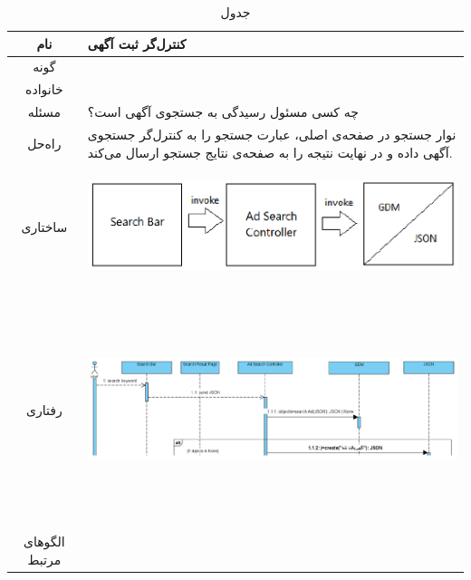 \begin{table}[H]
	\begin{adjustbox}{width=\textwidth}
		\begin{tabular}{|c|p{\textwidth}|}
			\hline
			نام &
			کنترل‌گر ثبت آگهی \\ 
			\hline
			گونه & 
			\grasp \\
			\hline
			خانواده &
			\controller \\
			\hline
			مسئله & 
			چه کسی مسئول رسیدگی به جستجوی آگهی است؟\\
			\hline
			راه‌حل& 
نوار جستجو در صفحه‌ی اصلی، عبارت جستجو را به کنترل‌گر جستجوی آگهی داده و در نهایت نتیجه را به صفحه‌ی نتایج جستجو ارسال می‌کند. \\
			\hline
			ساختاری & 
			\begin{minipage}{\textwidth}
				\begin{flushleft}
					\begin{minipage}{\textwidth}
						\includegraphics[width=13cm, height=2.7cm]{./images/7-2-1}
					\end{minipage}
				\end{flushleft}
			\end{minipage}
			
			\\
			\hline
			رفتاری & 
			\begin{minipage}{\textwidth}
				\begin{flushleft}
					\begin{minipage}{\textwidth}
						\includegraphics[width=13.5cm, height=6cm]{./images/7-2-2}
					\end{minipage}
				\end{flushleft}
			\end{minipage}
			\\
			\hline
			الگو‌های مرتبط& \\
			\hline
		\end{tabular}
	\end{adjustbox}
	\caption{جدول }
	\label{table-with-pic:2}
\end{table}

